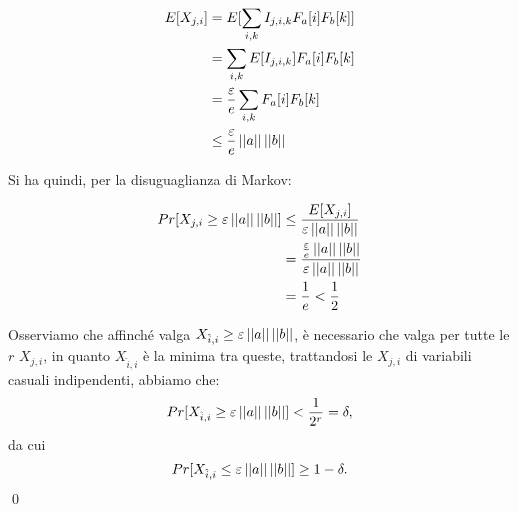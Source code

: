 \begin{proof*}
\begin{align}
    E[X_{j, i}] &= E[\sum_{i, k} I_{j, i, k} F_a[i] F_b[k]] \nonumber \\
    &= \sum_{i, k} E[I_{j, i, k}] F_a[i] F_b[k] \nonumber \\
    &= \frac{\varepsilon}{e} \sum_{i, k} F_a[i]F_b[k] \nonumber \\
    &\le \frac{\varepsilon}{e} \left|\left|a\right|\right|\left|\left|b\right|\right| \nonumber
\end{align}

Si ha quindi, per la disuguaglianza di Markov:

\begin{align}
    Pr[X_{j, i} \ge \varepsilon \left|\left|a\right|\right|\left|\left|b\right|\right|] &\le
        \frac{E[X_{j, i}]}{\varepsilon \left|\left|a\right|\right|\left|\left|b\right|\right|} \nonumber \\
        &= \frac{\frac{\varepsilon}{e} \left|\left|a\right|\right|\left|\left|b\right|\right|}
            {\varepsilon \left|\left|a\right|\right|\left|\left|b\right|\right|} \nonumber \\
        &= \frac{1}{e} < \frac{1}{2} \nonumber
\end{align}

Osserviamo che affinché valga $X_{\hat{i}, i} \ge \varepsilon \left|\left|a\right|\right|\left|\left|b\right|\right|$,
è necessario che valga per tutte le $r$ $X_{j, i}$, in quanto $X_{\hat{i}, i}$
è la minima tra queste, trattandosi le $X_{j, i}$ di variabili casuali
indipendenti, abbiamo che:
\[ Pr[X_{\hat{i}, i} \ge \varepsilon \left|\left|a\right|\right|\left|\left|b\right|\right|] < \frac{1}{2^r} = \delta, \]
da cui
\[ Pr[X_{\hat{i}, i} \le \varepsilon \left|\left|a\right|\right|\left|\left|b\right|\right|] \ge 1 - \delta. \]
\qed
\end{proof*}